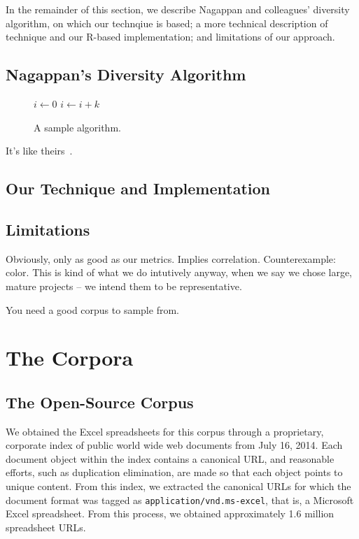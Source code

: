 \documentclass[conference]{IEEEtran}
\begin{document}
In the remainder of this section, we describe Nagappan and colleagues'
diversity algorithm, on which our technqiue is based; 
a more technical description of technique and our R-based implementation;
and limitations of our approach.

\subsection{Nagappan's Diversity Algorithm}

\begin{figure}[!t]
\begin{algorithmic}
    \State $i\gets 0$
\Else
        \State $i\gets i+k$
    \EndIf
\EndIf
\end{algorithmic}
\caption{A sample algorithm.}
\label{fig:algorithm}
\end{figure}

It's like theirs~\cite{nagappan2013diversity}.

\subsection{Our Technique and Implementation}

\subsection{Limitations}

Obviously, only as good as our metrics. Implies correlation. Counterexample: color.
This is kind of what we do intutively anyway, when we say we chose large, mature projects -- we intend them
to be representative.

You need a good corpus to sample from.

\section{The Corpora}

\subsection{The Open-Source Corpus}


We obtained the Excel spreadsheets for this corpus through a proprietary, corporate index of public world wide web documents from July 16, 2014. 
%
Each document object within the index contains a canonical URL, and reasonable efforts, such as duplication elimination, are made so that each object points to unique content. 
%
From this index, we extracted the canonical URLs for which the document format was tagged as \texttt{application/vnd.ms-excel}, that is, a Microsoft Excel spreadsheet. 
%
From this process, we obtained approximately 1.6 million spreadsheet URLs.
\end{document}

